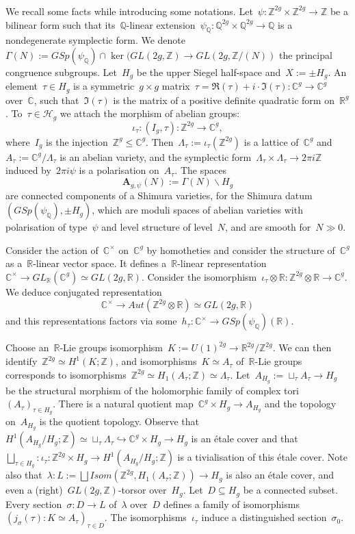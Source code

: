 \documentclass[12pt]{amsart}
\newcommand{\R}{{\mathbb R}}
\newcommand{\Z}{{\mathbb Z}}
\newcommand{\Q}{{\mathbb Q}}
\newcommand{\C}{{\mathbb C}}
\newcommand{\tens}{\otimes}
\newcommand{\sous}{\backslash}
\begin{document}
\subsubsection{}
We recall some facts while introducing some notations. Let~$\psi:\Z^{2g}\times\Z^{2g}\to \Z$ be a bilinear form such that its~$\Q$-linear extension~$\psi_\Q:\Q^{2g}\times\Q^{2g}\to \Q$ is a nondegenerate symplectic form. We denote~$\Gamma(N):=GSp(\psi_\Q)\cap \ker(GL(2g,\Z)\to GL(2g,\Z/(N))$ the principal congruence subgroups. Let~${H_g}$ be the upper Siegel half-space and~$X:=\pm {H}_g$. An element~$\tau\in{H}_g$ is a symmetric~$g\times g$ matrix~$\tau=\Re(\tau)+i\cdot \Im(\tau):\C^g\to \C^g$ over~$\C$, such that~$\Im(\tau)$ is the matrix of a positive definite quadratic form on~$\R^g$. To~$\tau\in \mathcal{H}_g$ we attach the morphism of abelian groups:
\begin{equation}\label{eq:iota}
\iota_\tau:(I_g,\tau):\Z^{2g}\to \C^g,
\end{equation}
where~$I_g$ is the injection~$\Z^{g}\leq \C^g$.
Then~$\Lambda_\tau:=\iota_\tau(\Z^{2g})$ is a lattice of~$\C^g$ and~$A_\tau:=\C^g/\Lambda_\tau$ is an abelian variety, and the symplectic form~$\Lambda_\tau\times \Lambda_\tau\to 2\pi i\Z$ induced by~$2\pi i\psi$ is a polarisation on~$A_\tau$. The spaces
\[
\mathbf{A}_{g,\psi}(N):=\Gamma(N)\sous{H}_g
\]
are connected components of a Shimura varieties, for the Shimura datum~$(GSp(\psi_\Q),\pm H_g)$, which are moduli spaces of abelian varieties with polarisation of type~$\psi$ 
and level structure of level~$N$, and are smooth for~$N\gg 0$.

Consider the action of~$\C^\times$ on~$\C^g$ by homotheties and consider the structure of~$\C^g$ as a~$\R$-linear vector space. It defines a~$\R$-linear representation~$\C^\times \to GL_\R(\C^g)\simeq GL(2g,\R)$. Consider the isomorphism~$\iota_\tau\tens\R:\Z^{2g}\tens\R\to \C^g$. We deduce conjugated representation
\[
\C^\times \to Aut(\Z^{2g}\tens\R)\simeq GL(2g,\R) 
\]
and this representations factors via some~$h_\tau:\C^\times\to GSp(\psi_\Q)(\R)$.

Choose an~$\R$-Lie groups isomorphism~$K:=U(1)^{2g}\to \R^{2g}/\Z^{2g}$. We can then identify~$\Z^{2g}\simeq H^{1}(K;\Z)$, and isomorphisms~$K\simeq A_\tau$ of~$\R$-Lie groups corresponds to isomorphisms~$\Z^{2g}\simeq H_1(A_\tau;\Z)\simeq \Lambda_\tau$.  Let~$A_{H_g}:=\sqcup_\tau A_\tau\to H_g$ be the structural morphism of the holomorphic family of complex tori~$(A_\tau)_{\tau\in H_g}$. There is a natural quotient map~$\C^g\times H_g\to A_{H_g}$ and the topology on~$A_{H_g}$ is the quotient topology. Observe that~$H^1(A_{H_g}/H_g;\Z)\simeq \sqcup_\tau \Lambda_\tau\hookrightarrow \C^g\times H_g\to H_g$ is an étale cover and that~$\bigsqcup_{\tau\in H_g}:\iota_\tau:\Z^{2g}\times H_g\to H^1(A_{H_g}/H_g;\Z)$ is a tivialisation of this étale cover. Note also that~$\lambda:L:=\bigsqcup Isom(\Z^{2g},H_1(A_\tau;\Z))\to H_g$ is also an étale cover, and even a (right)~$GL(2g,\Z)$-torsor over~$H_g$. Let~$D\subseteq {H_g}$ be a connected subset. Every section~$\sigma:D\to L$ of~$\lambda$ over~$D$ defines a family of isomorphisms~$(j_{\sigma}(\tau):K\simeq A_\tau)_{\tau\in D}$. The isomorphisms~$\iota_\tau$ induce a distinguished section~$\sigma_0$.
\end{document}
